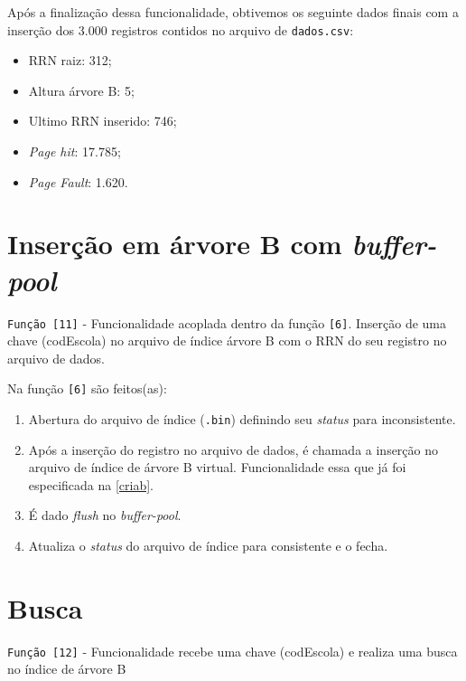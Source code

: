 \documentclass[
	12pt,				%
	openany,			%
	twoside,			%
	a4paper,			%
	english,			%
	french,				%
	spanish,			%
	brazil,				%
	]{abntex2}
\begin{document}
        Após a finalização dessa funcionalidade, obtivemos os seguinte dados finais com a inserção dos 3.000 registros contidos no arquivo de \verb|dados.csv|:
        
        \begin{itemize}
            \item RRN raiz: 312;
            \item Altura árvore B: 5;
            \item Ultimo RRN inserido: 746;
            \item \textit{Page hit}: 17.785;
            \item \textit{Page Fault}: 1.620.
        \end{itemize}
        
\section{Inserção em árvore B com \textit{buffer-pool}}

    \verb|Função [11]| - Funcionalidade acoplada dentro da função \verb|[6]|. Inserção de uma chave (codEscola) no arquivo de índice árvore B com o RRN do seu registro no arquivo de dados.
    
    Na função \verb|[6]| são feitos(as):
    
    \begin{enumerate}
        \item Abertura do arquivo de índice (\verb|.bin|) definindo seu \textit{status} para inconsistente.
        \item Após a inserção do registro no arquivo de dados, é chamada a inserção no arquivo de índice de árvore B virtual. Funcionalidade essa que já foi especificada na \autoref{criab}.
        \item É dado \textit{flush} no \textit{buffer-pool}.
        \item Atualiza o \textit{status} do arquivo de índice para consistente e o fecha.
    \end{enumerate}
    
\section{Busca}

    \verb|Função [12]| - Funcionalidade recebe uma chave (codEscola) e realiza uma busca no índice de árvore B
    
\end{document}
